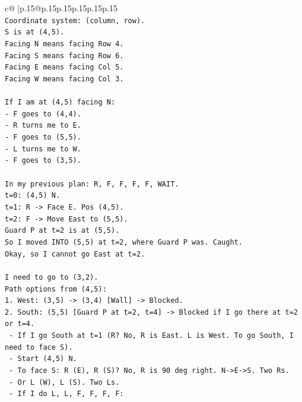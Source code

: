 \documentclass{article}
\begin{document}
{\begin{supertabular}{c@{$\;$}|p{.15\linewidth}@{}p{.15\linewidth}p{.15\linewidth}p{.15\linewidth}p{.15\linewidth}p{.15\linewidth}}
{{{\\ 
\texttt{Coordinate system: (column, row).} \\
\texttt{S is at (4,5).} \\
\texttt{Facing N means facing Row 4.} \\
\texttt{Facing S means facing Row 6.} \\
\texttt{Facing E means facing Col 5.} \\
\texttt{Facing W means facing Col 3.} \\
\\ 
\texttt{If I am at (4,5) facing N:} \\
\texttt{{-} F goes to (4,4).} \\
\texttt{{-} R turns me to E.} \\
\texttt{{-} F goes to (5,5).} \\
\texttt{{-} L turns me to W.} \\
\texttt{{-} F goes to (3,5).} \\
\\ 
\texttt{In my previous plan: R, F, F, F, F, WAIT.} \\
\texttt{t=0: (4,5) N.} \\
\texttt{t=1: R {-}> Face E. Pos (4,5).} \\
\texttt{t=2: F {-}> Move East to (5,5).} \\
\texttt{Guard P at t=2 is at (5,5).} \\
\texttt{So I moved INTO (5,5) at t=2, where Guard P was. Caught.} \\
\texttt{Okay, so I cannot go East at t=2.} \\
\\ 
\texttt{I need to go to (3,2).} \\
\texttt{Path options from (4,5):} \\
\texttt{1. West: (3,5) {-}> (3,4) {[}Wall{]} {-}> Blocked.} \\
\texttt{2. South: (5,5) {[}Guard P at t=2, t=4{]} {-}> Blocked if I go there at t=2 or t=4.} \\
\texttt{   {-} If I go South at t=1 (R? No, R is East. L is West. To go South, I need to face S).} \\
\texttt{   {-} Start (4,5) N.} \\
\texttt{   {-} To face S: R (E), R (S)? No, R is 90 deg right. N{-}>E{-}>S. Two Rs.} \\
\texttt{   {-} Or L (W), L (S). Two Ls.} \\
\texttt{   {-} If I do L, L, F, F, F, F:} \\
}}}
\end{supertabular}}
\end{document}
